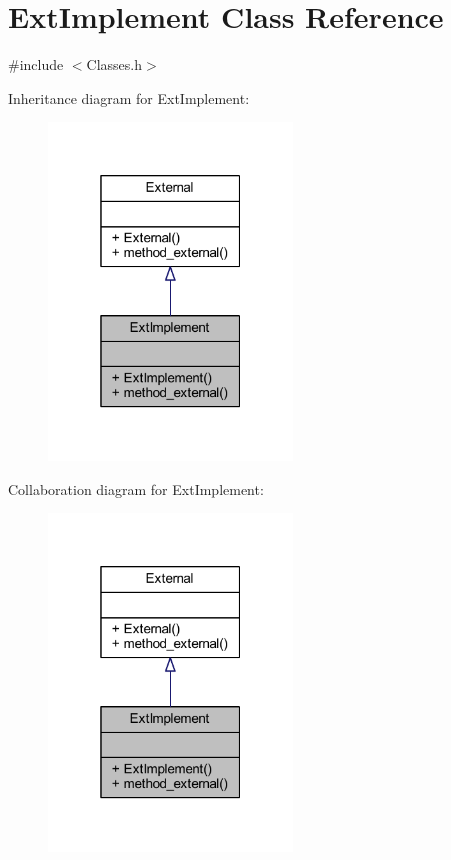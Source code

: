 \hypertarget{class_ext_implement}{}\section{Ext\+Implement Class Reference}
\label{class_ext_implement}


{\ttfamily \#include $<$Classes.\+h$>$}



Inheritance diagram for Ext\+Implement\+:
\nopagebreak
\begin{figure}[H]
\begin{center}
\leavevmode
\includegraphics[width=184pt]{class_ext_implement__inherit__graph}
\end{center}
\end{figure}


Collaboration diagram for Ext\+Implement\+:
\nopagebreak
\begin{figure}[H]
\begin{center}
\leavevmode
\includegraphics[width=184pt]{class_ext_implement__coll__graph}
\end{center}
\end{figure}
